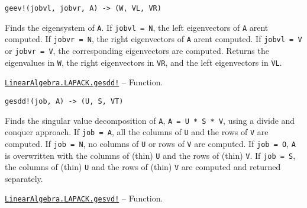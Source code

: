\begin{adjustwidth}{2em}{0pt}


\begin{verbatim}
geev!(jobvl, jobvr, A) -> (W, VL, VR)
\end{verbatim}

Finds the eigensystem of \texttt{A}. If \texttt{jobvl = N}, the left eigenvectors of \texttt{A} aren{\textquotesingle}t computed. If \texttt{jobvr = N}, the right eigenvectors of \texttt{A} aren{\textquotesingle}t computed. If \texttt{jobvl = V} or \texttt{jobvr = V}, the corresponding eigenvectors are computed. Returns the eigenvalues in \texttt{W}, the right eigenvectors in \texttt{VR}, and the left eigenvectors in \texttt{VL}.



\end{adjustwidth}
\hypertarget{15765350085042341790}{} 
\hyperlink{15765350085042341790}{\texttt{LinearAlgebra.LAPACK.gesdd!}}  -- {Function.}

\begin{adjustwidth}{2em}{0pt}


\begin{verbatim}
gesdd!(job, A) -> (U, S, VT)
\end{verbatim}

Finds the singular value decomposition of \texttt{A}, \texttt{A = U * S * V{\textquotesingle}}, using a divide and conquer approach. If \texttt{job = A}, all the columns of \texttt{U} and the rows of \texttt{V{\textquotesingle}} are computed. If \texttt{job = N}, no columns of \texttt{U} or rows of \texttt{V{\textquotesingle}} are computed. If \texttt{job = O}, \texttt{A} is overwritten with the columns of (thin) \texttt{U} and the rows of (thin) \texttt{V{\textquotesingle}}. If \texttt{job = S}, the columns of (thin) \texttt{U} and the rows of (thin) \texttt{V{\textquotesingle}} are computed and returned separately.



\end{adjustwidth}
\hypertarget{12815780161722855374}{} 
\hyperlink{12815780161722855374}{\texttt{LinearAlgebra.LAPACK.gesvd!}}  -- {Function.}

